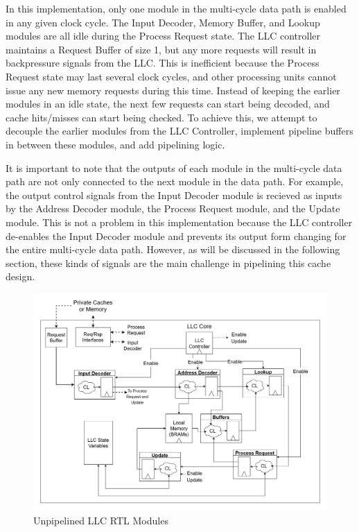 \documentclass{sig-alternate}
\begin{document}
In this implementation, only one module in the multi-cycle data path is enabled in any given clock cycle. The Input Decoder, Memory Buffer, and Lookup modules are all idle during the Process Request state. The LLC controller maintains
a Request Buffer of size 1, but any more requests will result in backpressure signals from the LLC. This is inefficient because
the Process Request state may last several clock cycles, and other processing units cannot
issue any new memory requests during this time. Instead of keeping the earlier modules
in an idle state, the next few requests can start being decoded, and cache hits/misses can start being checked. To achieve this, we attempt to decouple the earlier modules from the LLC Controller, 
implement pipeline buffers in between these modules, and add pipelining logic.
\par It is important to note that the outputs of each module in the multi-cycle data path are not only connected to the next module in the data path. For example, the output control signals from the Input Decoder 
module is recieved as inputs by the Address Decoder module, the Process Request module, and the Update module. This is not a problem in this implementation because the LLC controller de-enables the Input Decoder 
module and prevents its output form changing for the entire multi-cycle data path. However, as will be discussed in the following section, these kinds of signals are the main challenge in pipelining this cache design.

\begin{figure}[h]
  \centering
  \captionsetup{justification=centering, format=hang}
  \includegraphics[width=1\textwidth]{fig/LLC_RTL_Unpipelined_3.png}
  \caption{Unpipelined LLC RTL Modules}
  \label{fig:llc}
  \end{figure}
\end{document}
